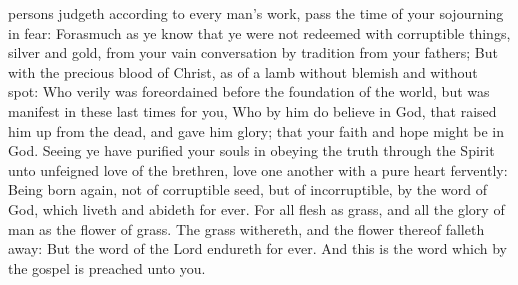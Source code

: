 {persons
judgeth according
to every
man’s
work,
pass the
time of
your
sojourning
{}
in
fear:
Forasmuch as ye
know
that ye
were
not
redeemed with corruptible
things,
{}
silver
and
gold,
from
your
vain
conversation
{} by tradition from your
fathers;
But with the
precious
blood of
Christ,
as of a
lamb without
blemish
and without
spot:
Who
verily was
foreordained
before the
foundation of the
world,
but was
manifest
in these
last
times
for
you,
Who
by
him do
believe
in
God,
that
raised
him
up
from the
dead,
and
gave
him
glory;
that
your
faith
and
hope might
be
in
God.
Seeing ye have
purified
your
souls
in
obeying the
truth
through the
Spirit
unto
unfeigned love of the
brethren,
{}
love one
another
with a
pure
heart
fervently:
Being born
again,
not
of
corruptible
seed,
but of
incorruptible,
by the
word of
God, which
liveth
and
abideth
for
ever.
For
all
flesh
{}
as
grass,
and
all the
glory of
man
as the
flower of
grass. The
grass
withereth,
and the
flower
thereof falleth
away:
But the
word of the
Lord
endureth
for
ever.
And
this
is the
word
which by the gospel is
preached
unto
you.

}
